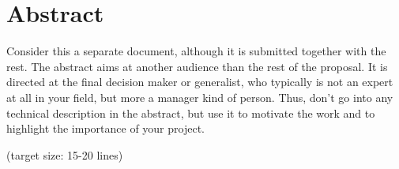   \section*{Abstract}
  
  Consider this a separate document, although it is submitted together
  with the rest. The abstract aims at another audience than the rest
  of the proposal. It is directed at the final decision maker or
  generalist, who typically is not an expert at all in your field, but
  more a manager kind of person. Thus, don't go into any technical
  description in the abstract, but use it to motivate the work and to
  highlight the importance of your project.

  (target size: 15-20 lines)